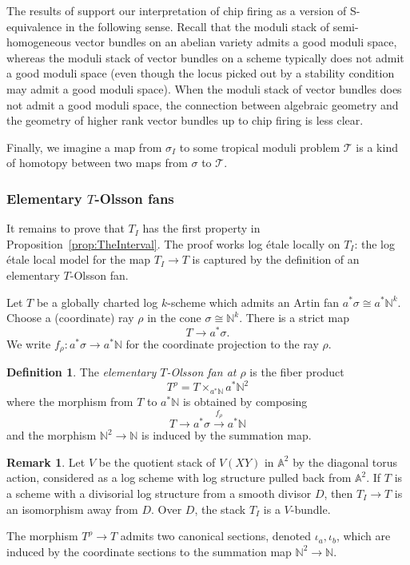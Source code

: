 \documentclass[11pt]{amsart}
\theoremstyle{definition}
\theoremstyle{definition}
\newtheorem{remark}[theorem]{Remark}
\newtheorem{definition}[theorem]{Definition}
\begin{document}
The results of \cite{GrossKaurWernerTropical,GrossZakharov2022} support our interpretation of chip firing as a version of S-equivalence in the following sense. Recall that the moduli stack of semi-homogeneous vector bundles on an abelian variety admits a good moduli space, whereas the moduli stack of vector bundles on a scheme typically does not admit a good moduli space (even though the locus picked out by a stability condition may admit a good moduli space). When the moduli stack of vector bundles does not admit a good moduli space, the connection between algebraic geometry and the geometry of higher rank vector bundles up to chip firing is less clear. 

Finally, we imagine a map from $\sigma_I$ to some tropical moduli problem $\mathcal{T}$ is a kind of homotopy between two maps from $\sigma$ to $\mathcal{T}$.

\subsubsection{Elementary $T$-Olsson fans}\label{sec:elemolsson}
It remains to prove that $T_I$ has the first property in Proposition~\ref{prop:TheInterval}. The proof works log \'etale locally on $T_I$: the log \'etale local model for the map $T_I\rightarrow T$ is captured by the definition of an elementary $T$-Olsson fan.


Let $T$ be a globally charted log $k$-scheme which admits an Artin fan $a^*\sigma \cong a^\ast\mathbb{N}^k$.
Choose a (coordinate) ray $\rho$ in the cone $\sigma\cong \mathbb{N}^k$.
There is a strict map $$T\longrightarrow a^\ast \sigma.$$
We write $f_\rho\colon a^\ast \sigma\longrightarrow a^\ast \mathbb{N}$ for the coordinate projection to the ray $\rho$.


\begin{definition}
    The \textit{elementary $T$-Olsson fan at $\rho$} is the fiber product $$T^\rho = T\times_{a^\ast \mathbb{N}} a^\ast \mathbb{N}^2$$ where the morphism from $T$ to $a^\ast \mathbb{N}$ is obtained by composing $$T\longrightarrow a^\ast \sigma \xrightarrow{f_{\rho}} a^\ast \mathbb{N}$$
    and the morphism $\mathbb{N}^2\rightarrow \mathbb{N}$ is induced by the summation map.
\end{definition}
\begin{remark}
    Let $V$ be the quotient stack of $V(XY)$ in $\mathbb{A}^2$ by the diagonal torus action, considered as a log scheme with log structure pulled back from $\mathbb{A}^2$. If $T$ is a scheme with a divisorial log structure from a smooth divisor $D$, then $T_I\rightarrow T$ is an isomorphism away from $D$. Over $D$, the stack $T_I$ is a $V$-bundle.
\end{remark}
The morphism $T^\rho\rightarrow T$ admits two canonical sections, denoted $\iota_a,\iota_b$, which are induced by the coordinate sections to the summation map $\mathbb{N}^2\longrightarrow \mathbb{N}.$
\end{document}
